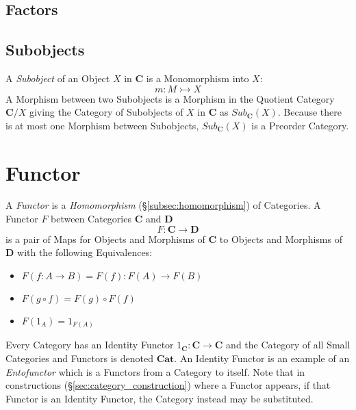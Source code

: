 \subsection{Factors}\label{subsec:morphism_factor}

\subsection{Subobjects}\label{subsec:category_subobjects}

A \emph{Subobject} of an Object $X$ in $\mathbf{C}$ is a Monomorphism
into $X$:
\[
    m : M \rightarrowtail X
\]
A Morphism between two Subobjects is a Morphism in the Quotient
Category $\mathbf{C}/X$ giving the Category of Subobjects of $X$ in
$\mathbf{C}$ as $Sub_{\mathbf{C}}(X)$. Because there is at most one
Morphism between Subobjects, $Sub_{\mathbf{C}}(X)$ is a Preorder
Category.



\section{Functor}\label{sec:functor}

A \emph{Functor} is a \emph{Homomorphism}
(\S\ref{subsec:homomorphism}) of Categories. A Functor $F$ between
Categories $\mathbf{C}$ and $\mathbf{D}$
\[
    F : \mathbf{C} \rightarrow \mathbf{D}
\]
is a pair of Maps for Objects and Morphisms of $\mathbf{C}$ to Objects
and Morphisms of $\mathbf{D}$ with the following Equivalences:
\begin{itemize}
\item $F(f : A \rightarrow B) = F(f) : F(A) \rightarrow F(B)$
\item $F(g \circ f) = F(g) \circ F(f)$
\item $F(1_A) = 1_{F(A)}$
\end{itemize}
Every Category has an Identity Functor $1_{\mathbf{C}} : \mathbf{C}
\rightarrow \mathbf{C}$ and the Category of all Small Categories and
Functors is denoted $\mathbf{Cat}$. An Identity Functor is an example
of an \emph{Entofunctor} which is a Functors from a Category to
itself. Note that in constructions (\S\ref{sec:category_construction})
where a Functor appears, if that Functor is an Identity Functor, the
Category instead may be substituted.

